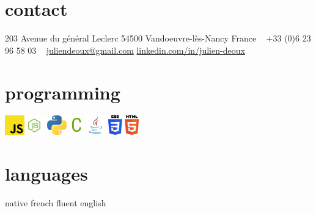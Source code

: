 \documentclass[]{lemaki-cv}
\begin{document}


	\begin{aside} %
		\section{contact}
		{\footnotesize 203 Avenue du général Leclerc
		54500 Vandoeuvre-lès-Nancy
		France}
		~
		{\footnotesize +33 (0)6 23 96 58 03}
		~
		\href{mailto:juliendeoux@gmail.com}{\footnotesize juliendeoux@gmail.com}
		\href{https://www.linkedin.com/in/julien-deoux}{\footnotesize linkedin.com/in/julien-deoux}
		\section{programming}
		\includegraphics[height=24pt]{figures/js}\includegraphics[height=24pt]{figures/nodejs}
		\includegraphics[height=24pt]{figures/python}\includegraphics[height=24pt]{figures/c}\includegraphics[height=24pt]{figures/java}
		\includegraphics[height=24pt]{figures/web}
		\section{languages}
		\footnotesize native french
		\footnotesize fluent english

\end{aside}
\end{document}
